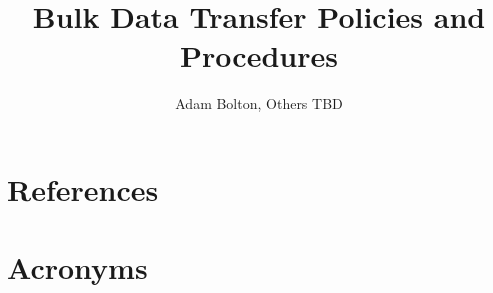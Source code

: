 \documentclass[OPS,lsstdraft,authoryear,toc]{lsstdoc}
\title{Bulk Data Transfer Policies and Procedures}
\author{ Adam Bolton, Others TBD }
\date{\vcsDate}
\begin{document}
\maketitle




\appendix
\section{References} \label{sec:bib}
\renewcommand{\refname}{} %


\section{Acronyms} \label{sec:acronyms}

\end{document}

